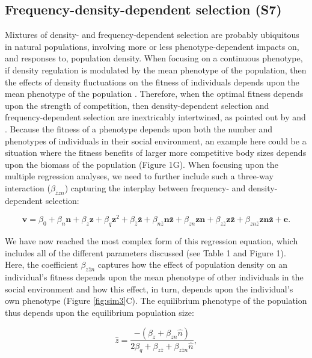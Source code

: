 \documentclass{article}
\begin{document}
	\subsection{Frequency-density-dependent selection (S7)}
	Mixtures of density- and frequency-dependent selection are probably ubiquitous in natural populations, involving more or less phenotype-dependent impacts on, and responses to, population density. When focusing on a continuous phenotype, if density regulation is modulated by the mean phenotype of the population, then the effects of density fluctuations on the fitness of individuals depends upon the mean phenotype of the population \citep{Engen2020}. Therefore, when the optimal fitness depends upon the strength of competition, then density-dependent selection and frequency-dependent selection are inextricably intertwined, as pointed out by \cite{Smouse1976} and \cite{Heino1998}. Because the fitness of a phenotype depends upon both the number and phenotypes of individuals in their social environment, an example here could be a situation where the fitness benefits of larger more competitive body sizes depends upon the biomass of the population (Figure 1G). When focusing upon the multiple regression analyses, we need to further include such a three-way interaction ($\beta_{\bar{z}zn}$) capturing the interplay between frequency- and density-dependent selection:
	
	\begin{equation} \label{eq: fitness_S7}
	\bm{v}=\beta_{0} +\beta_{n} \bm{n} + \beta_{z} \bm{z} + \beta_{q} \bm{z}^2 + \beta_{\bar{z}} \bm{\bar{z}}  +   \beta_{n\bar{z}} \bm{n\bar{z}} +   \beta_{zn} \bm{zn} + \beta_{z\bar{z}} \bm{z\bar{z}}   +   \beta_{zn\bar{z}} \bm{zn\bar{z}} + \bm{e}.
	\end{equation}
	
	\noindent We have now reached the most complex form of this regression equation, which includes all of the different parameters discussed (see Table 1 and Figure 1). Here, the coefficient $\beta_{z\bar{z}n}$ captures how the effect of population density on an individual's fitness depends upon the mean phenotype of other individuals in the social environment and how this effect, in turn, depends upon the individual's own phenotype (Figure \ref{fig:sim3}C). The equilibrium phenotype of the population thus depends upon the equilibrium population size: 
	
	\begin{equation} \label{eq: eq_z_S7}
	\hat{z}=\frac{-(\beta_{z}+\beta_{zn}\hat{n})}{2\beta_{q} + \beta_{z\bar{z}} + \beta_{z\bar{z}n}\hat{n}},
	\end{equation} 
	
\end{document}
